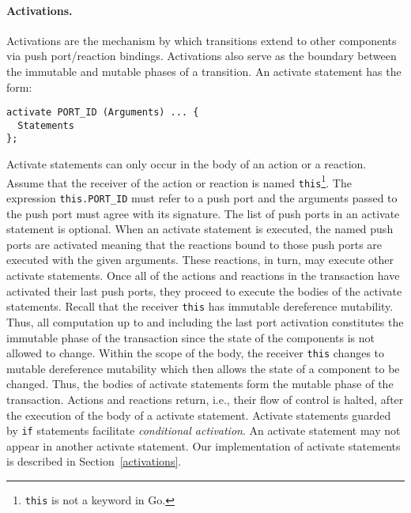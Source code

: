 \paragraph{Activations.}
Activations are the mechanism by which transitions extend to other components via push port/reaction bindings.
Activations also serve as the boundary between the immutable and mutable phases of a transition.
An activate statement has the form:
\begin{verbatim}
activate PORT_ID (Arguments) ... {
  Statements
};
\end{verbatim}
Activate statements can only occur in the body of an action or a reaction.
Assume that the receiver of the action or reaction is named \verb+this+\footnote{\verb+this+ is not a keyword in Go.}.
The expression \verb+this.PORT_ID+ must refer to a push port and the arguments passed to the push port must agree with its signature.
The list of push ports in an activate statement is optional.
When an activate statement is executed, the named push ports are activated meaning that the reactions bound to those push ports are executed with the given arguments.
These reactions, in turn, may execute other activate statements.
Once all of the actions and reactions in the transaction have activated their last push ports, they proceed to execute the bodies of the activate statements.
Recall that the receiver \verb+this+ has immutable dereference mutability.
Thus, all computation up to and including the last port activation constitutes the immutable phase of the transaction since the state of the components is not allowed to change.
Within the scope of the body, the receiver \verb+this+ changes to mutable dereference mutability which then allows the state of a component to be changed.
Thus, the bodies of activate statements form the mutable phase of the transaction.
Actions and reactions return, i.e., their flow of control is halted, after the execution of the body of a activate statement.
Activate statements guarded by \verb+if+ statements facilitate \emph{conditional activation}.
An activate statement may not appear in another activate statement.
Our implementation of activate statements is described in Section~\ref{activations}.

